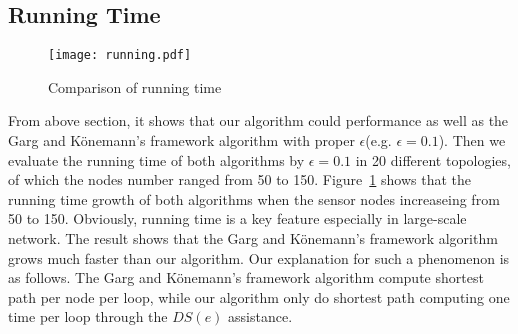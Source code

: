 \documentclass{article}
\begin{document}
\subsection{Running Time}

\begin{figure}[H]
\centering
\texttt{[image: running.pdf]} 
\caption{Comparison of running time}
\label{f2}
\end{figure}
From above section, it shows that our algorithm could performance as well as the Garg and K\"{o}nemann's framework algorithm with proper $\epsilon$(e.g. $\epsilon = 0.1$). Then we evaluate the running time of both algorithms by $\epsilon =0.1$ in 20 different topologies, of which the nodes number ranged from 50 to 150.
Figure~\ref{f2} shows that the running time growth of both algorithms when the sensor nodes increaseing from 50 to 150. Obviously, running time is a key feature especially in large-scale network. The result shows that the Garg and K\"{o}nemann's framework algorithm 
grows much faster than our algorithm. Our explanation for such a phenomenon is as follows. The Garg and K\"{o}nemann's framework algorithm compute shortest path per node per loop, while our algorithm only do shortest path computing one time per loop through the $DS(e)$ assistance. 




\end{document}
